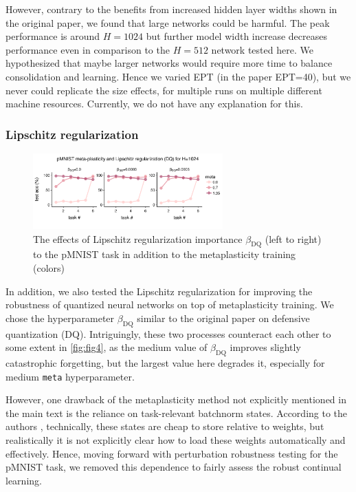 \documentclass[manuscript,screen,review=false, nonacm]{acmart}
\begin{document}
However, contrary to the benefits from increased hidden layer widths shown in the original paper, we found that large networks could be harmful. The peak performance is around $H=1024$ but further model width increase decreases performance even in comparison to the $H=512$ network tested here. We hypothesized that maybe larger networks would require more time to balance consolidation and learning. Hence we varied EPT (in the paper EPT=40), but we never could replicate the size effects, for multiple runs on multiple different machine resources. Currently, we do not have any explanation for this. 

\subsubsection{Lipschitz regularization}

\begin{figure}[ht]
    \centering
    \includegraphics[width=0.65\textwidth]{figures/report/Fig4.pdf}
    \caption{The effects of Lipschitz regularization importance $\beta_{\mathrm{DQ}}$ (left to right) to the pMNIST task in addition to the metaplasticity training (colors)}
    \label{fig:fig4}
\end{figure}

In addition, we also tested the Lipschitz regularization for improving the robustness of quantized neural networks \cite{Lin_2019} on top of metaplasticity training. We chose the hyperparameter $\beta_{\mathrm{DQ}}$ similar to the original paper on defensive quantization (DQ). Intriguingly, these two processes counteract each other to some extent in \autoref{fig:fig4}, as the medium value of $\beta_{\mathrm{DQ}}$ improves slightly catastrophic forgetting, but the largest value here degrades it, especially for medium \texttt{meta} hyperparameter. 

However, one drawback of the metaplasticity method not explicitly mentioned in the main text is the reliance on task-relevant batchnorm states. According to the authors \cite{Laborieux_Ernoult_Hirtzlin_Querlioz_2021}, technically, these states are cheap to store relative to weights, but realistically it is not explicitly clear how to load these weights automatically and effectively. Hence, moving forward with perturbation robustness testing for the pMNIST task, we removed this dependence to fairly assess the robust continual learning. 
\end{document}
